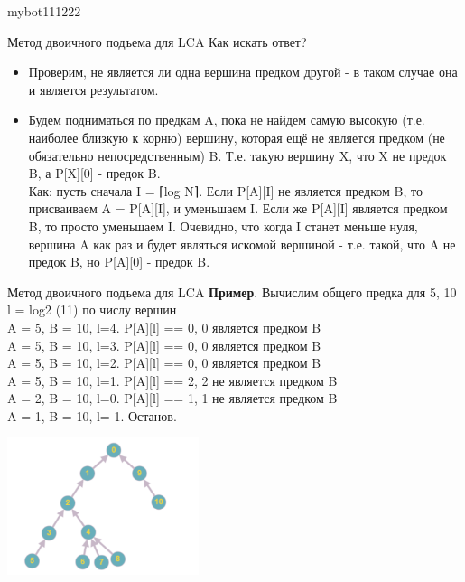 mybot111222\documentclass[10pt]{beamer}
\begin{document}
\begin{frame}[fragile]{Метод двоичного подъема для LCA}
Как искать ответ?
\begin{itemize}
    \item Проверим, не является ли одна вершина предком другой - в таком случае она и является результатом.
    \item Будем подниматься по предкам A, пока не найдем самую высокую (т.е. наиболее близкую к корню) вершину, которая ещё не является предком (не обязательно непосредственным) B. Т.е. такую вершину X, что X не предок B, а P[X][0] - предок B. \\
    Как: пусть сначала I = ⌈log N⌉. Если P[A][I] не является предком B, то присваиваем A = P[A][I], и уменьшаем I. Если же P[A][I] является предком B, то просто уменьшаем I. Очевидно, что когда I станет меньше нуля, вершина A как раз и будет являться искомой вершиной - т.е. такой, что A не предок B, но P[A][0] - предок B.
\end{itemize}
\end{frame}

\begin{frame}[fragile]{Метод двоичного подъема для LCA}
\textbf{Пример}. Вычислим общего предка для 5, 10 \\
l = log2 (11) по числу вершин \\
A = 5, B = 10, l=4. P[A][l] == 0, 0 является предком B \\
A = 5, B = 10, l=3. P[A][l] == 0, 0 является предком B \\
A = 5, B = 10, l=2. P[A][l] == 0, 0 является предком B \\
A = 5, B = 10, l=1. P[A][l] == 2, 2 не является предком B \\
A = 2, B = 10, l=0. P[A][l] == 1, 1 не является предком B \\
A = 1, B = 10, l=-1. Останов.

\begin{center}
    \includegraphics[height=4cm]{Term_2/Source/images/10-lca.png}
\end{center}
\end{frame}
\end{document}
